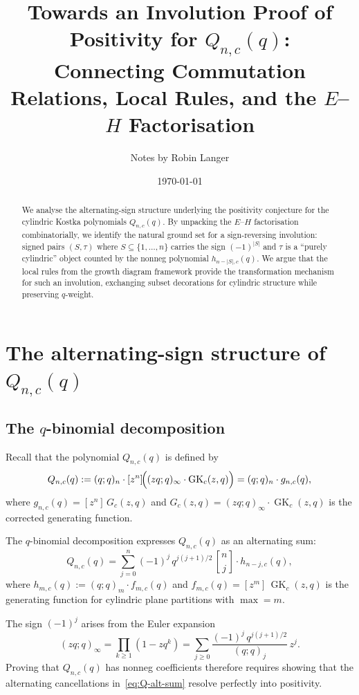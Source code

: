 \documentclass[11pt]{article}
\title{Towards an Involution Proof of Positivity for $Q_{n,c}(q)$:\\
Connecting Commutation Relations, Local Rules, and the $E$--$H$ Factorisation}
\author{Notes by Robin Langer}
\date{\today}
\newcommand{\GK}{\operatorname{GK}}
\newcommand{\qpoch}[2]{(#1;#2)_\infty}
\newcommand{\qpochn}[3]{(#1;#2)_{#3}}
\newcommand{\qbin}[2]{\genfrac{[}{]}{0pt}{}{#1}{#2}}
\theoremstyle{plain}
\theoremstyle{definition}
\begin{document}
\maketitle

\begin{abstract}
We analyse the alternating-sign structure underlying the positivity
conjecture for the cylindric Kostka polynomials $Q_{n,c}(q)$.
By unpacking the $E$--$H$ factorisation combinatorially, we identify
the natural ground set for a sign-reversing involution: signed pairs
$(S, \tau)$ where $S \subseteq \{1, \ldots, n\}$ carries the sign
$(-1)^{|S|}$ and $\tau$ is a ``purely cylindric'' object counted by
the nonneg polynomial $h_{n-|S|,c}(q)$.  We argue that the local
rules from the growth diagram framework provide the transformation
mechanism for such an involution, exchanging subset decorations for
cylindric structure while preserving $q$-weight.
\end{abstract}

\tableofcontents

\section{The alternating-sign structure of $Q_{n,c}(q)$}
\label{sec:alt-sign}

\subsection{The $q$-binomial decomposition}

Recall that the polynomial $Q_{n,c}(q)$ is defined by
\[
  Q_{n,c}(q) := \qpochn{q}{q}{n}
  \cdot [z^n]\!\Bigl(\qpoch{zq}{q} \cdot \GK_c(z,q)\Bigr)
  = \qpochn{q}{q}{n} \cdot g_{n,c}(q),
\]
where $g_{n,c}(q) = [z^n]\,G_c(z,q)$ and
$G_c(z,q) = \qpoch{zq}{q} \cdot \GK_c(z,q)$ is the corrected
generating function.

The $q$-binomial decomposition expresses $Q_{n,c}(q)$ as an
alternating sum:
\begin{equation}\label{eq:Q-alt-sum}
  Q_{n,c}(q) = \sum_{j=0}^{n} (-1)^j\, q^{j(j+1)/2}\,
  \qbin{n}{j} \cdot h_{n-j,c}(q),
\end{equation}
where $h_{m,c}(q) := \qpochn{q}{q}{m} \cdot f_{m,c}(q)$
and $f_{m,c}(q) = [z^m]\,\GK_c(z,q)$ is the generating function
for cylindric plane partitions with $\max = m$.

The sign $(-1)^j$ arises from the Euler expansion
\[
  \qpoch{zq}{q} = \prod_{k \geq 1}(1 - zq^k)
  = \sum_{j \geq 0} \frac{(-1)^j\, q^{j(j+1)/2}}{\qpochn{q}{q}{j}}\, z^j.
\]
Proving that $Q_{n,c}(q)$ has nonneg coefficients therefore
requires showing that the alternating cancellations
in~\eqref{eq:Q-alt-sum} resolve perfectly into positivity.
\end{document}
